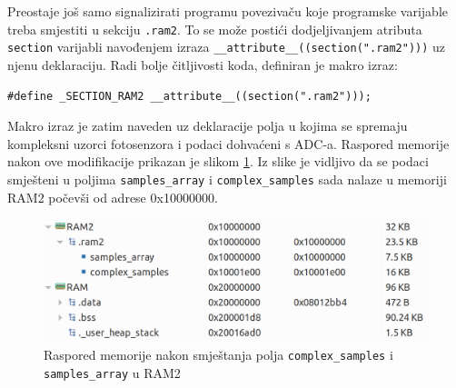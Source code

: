 Preostaje još samo signalizirati programu povezivaču koje programske varijable treba smjestiti u sekciju \texttt{.ram2}. To se može postići dodjeljivanjem atributa \texttt{section} varijabli navođenjem izraza \texttt{\_\_attribute\_\_((section(".ram2")))} uz njenu deklaraciju. Radi bolje čitljivosti koda, definiran je makro izraz:

\begin{lstlisting}[caption={Makro izraz za dodjelu atributa \texttt{section} programskim varijablama}]
#define _SECTION_RAM2 __attribute__((section(".ram2")));
\end{lstlisting}

Makro izraz je zatim naveden uz deklaracije polja u kojima se spremaju kompleksni uzorci fotosenzora i podaci dohvaćeni s ADC-a. Raspored memorije nakon ove modifikacije prikazan je slikom \ref{fig:memorija}. Iz slike je vidljivo da se podaci smješteni u poljima \texttt{samples\_array} i \texttt{complex\_samples} sada nalaze u memoriji RAM2 počevši od adrese 0x10000000.

\begin{figure}[htb]
    \centering
    \includegraphics[width=\textwidth]{slike/memorija.png}
    \caption{Raspored memorije nakon smještanja polja \texttt{complex\_samples} i \texttt{samples\_array} u RAM2}
    \label{fig:memorija}
\end{figure}